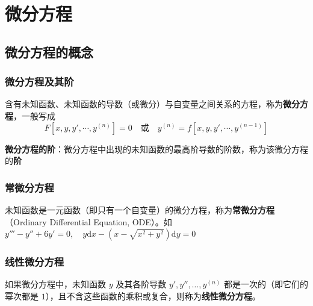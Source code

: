 \documentclass[../book.tex]{subfiles}
\begin{document}
    \section{微分方程}

    \subsection{微分方程的概念}

    \subsubsection{微分方程及其阶}

    含有未知函数、未知函数的导数（或微分）与自变量之间关系的方程，称为\textbf{微分方程}，一般写成
    \[
        F[x, y, y',\cdots, y^{(n)}] = 0 \quad \text{或} \quad y^{(n)} = f[x, y, y',\cdots, y^{(n-1)}]
    \]

    \textbf{微分方程的阶}：微分方程中出现的未知函数的最高阶导数的阶数，称为该微分方程的\textbf{阶}

    \subsubsection{常微分方程}

    未知函数是一元函数（即只有一个自变量）的微分方程，称为\textbf{常微分方程}（Ordinary Differential Equation, ODE）。如$y''' - y'' + 6y' = 0,\quad y\mathrm{d}x - (x - \sqrt{x^2 + y^2})\mathrm{d}y = 0$

    \subsubsection{线性微分方程}

    如果微分方程中，未知函数 $y$ 及其各阶导数 $y', y'', \ldots, y^{(n)}$ 都是一次的（即它们的幂次都是 $1$），且不含这些函数的乘积或复合，则称为\textbf{线性微分方程}。
\end{document}
